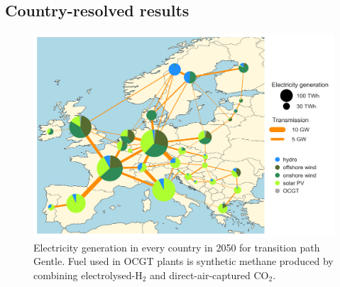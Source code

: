 \documentclass[3p]{elsarticle} %
\begin{document}
\FloatBarrier

\clearpage
\subsection{Country-resolved results}

\begin{figure}[!h]
\centering
\includegraphics[width=0.8\columnwidth]{figures/spatial_electricity_generation_Base.png}
\caption{Electricity generation in every country in 2050 for transition path Gentle. Fuel used in OCGT plants is synthetic methane produced by combining electrolysed-H$_2$ and direct-air-captured CO$_2$.} \label{fig_spatial_plot} 
\end{figure}
\end{document}
